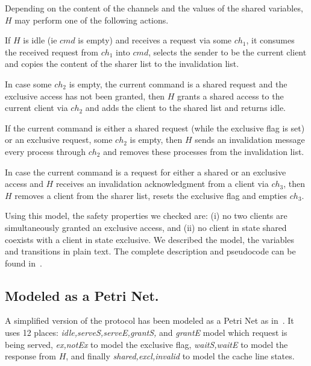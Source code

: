 Depending on the content of the channels and the values of the shared
variables, $H$ may perform one of the following actions.
\begin{description}[leftmargin=6em,style=nextline,align=right,labelsep=\parindent]
\item[\color{orange} $h_1$] If $H$ is idle (ie $cmd$ is empty) and receives a request via
  some $ch_1$, it consumes the received request from $ch_1$ into
  $cmd$, selects the sender to be the current client and copies the
  content of the sharer list to the invalidation list.
\item[\color{orange} $h_2$] In case some $ch_2$ is empty, the current command is a
  shared request and the exclusive access has not been granted, then
  $H$ grants a shared access to the current client via $ch_2$ and adds
  the client to the shared list and returns idle.
\item[{\color{orange} $h_3$},{\color{orange}~$h_4$}] If the current command is either a shared request
  (while the exclusive flag is set) or an exclusive request, some
  $ch_2$ is empty, then $H$ sends an invalidation message every
  process through $ch_2$ and removes these processes from the
  invalidation list.
\item[\color{orange} $h_5$] In case the current command is a request for either a
  shared or an exclusive access and $H$ receives an invalidation
  acknowledgment from a client via $ch_3$, then $H$ removes a client
  from the sharer list, resets the exclusive flag and empties $ch_3$.
\end{description}
%
Using this model, the safety properties we checked are: (i) no two
clients are simultaneously granted an exclusive access, and (ii) no
client in state shared coexists with a client in state exclusive.
%
We described the model, the variables and transitions in plain
text. The complete description and pseudocode can be found
in~\cite{PRZ-tacas01}. 

\subsection*{Modeled as a Petri Net.}
A simplified version of the protocol has been modeled as a Petri Net
as in~\cite{Raskin:experiments:German}. It uses 12 places:
\emph{idle,serveS,serveE,grantS,} and \emph{grantE} model which
request is being served, \emph{ex,notEx} to model the exclusive flag,
\emph{waitS,waitE} to model the response from $H$, and finally
\emph{shared,excl,invalid} to model the cache line states.


